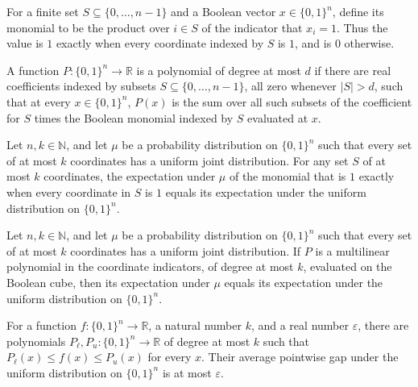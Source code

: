 \begin{definition}
\label{Monomial}
\leanok
For a finite set $S\subseteq\{0,\ldots,n-1\}$ and a Boolean vector $x\in\{0,1\}^n$,
define its monomial to be the product over $i\in S$ of the indicator that $x_i=1$. Thus
the value is $1$ exactly when every coordinate indexed by $S$ is $1$, and is $0$
otherwise.
\end{definition}

\begin{definition}
\label{IsPolynomial}
\leanok
{}
A function $P:\{0,1\}^n\to\mathbb R$ is a polynomial of degree at most $d$ if there are
real coefficients indexed by subsets $S\subseteq\{0,\ldots,n-1\}$, all zero whenever
$|S|>d$, such that at every $x\in\{0,1\}^n$, $P(x)$ is the sum over all such subsets of
the coefficient for $S$ times the Boolean monomial indexed by $S$ evaluated at $x$.
\end{definition}

\begin{theorem}
\label{KWise_Fools_Monomial}
\leanok
{}
Let $n,k\in\mathbb N$, and let $\mu$ be a probability distribution on $\{0,1\}^n$ such
that every set of at most $k$ coordinates has a uniform joint distribution. For any set
$S$ of at most $k$ coordinates, the expectation under $\mu$ of the monomial that is $1$
exactly when every coordinate in $S$ is $1$ equals its expectation under the uniform
distribution on $\{0,1\}^n$.
\end{theorem}

\begin{theorem}
\label{KWise_Fools_Polynomial}
\leanok
{}
Let $n,k\in\mathbb N$, and let $\mu$ be a probability distribution on $\{0,1\}^n$ such
that every set of at most $k$ coordinates has a uniform joint distribution. If $P$ is a
multilinear polynomial in the coordinate indicators, of degree at most $k$, evaluated on
the Boolean cube, then its expectation under $\mu$ equals its expectation under the
uniform distribution on $\{0,1\}^n$.
\end{theorem}

\begin{definition}
\label{SandwichingPolynomials}
\leanok
{}
For a function $f:\{0,1\}^n\to\mathbb R$, a natural number $k$, and a real number
$\varepsilon$, there are polynomials $P_\ell,P_u:\{0,1\}^n\to\mathbb R$ of degree at
most $k$ such that $P_\ell(x)\le f(x)\le P_u(x)$ for every $x$. Their average pointwise
gap under the uniform distribution on $\{0,1\}^n$ is at most $\varepsilon$.
\end{definition}

